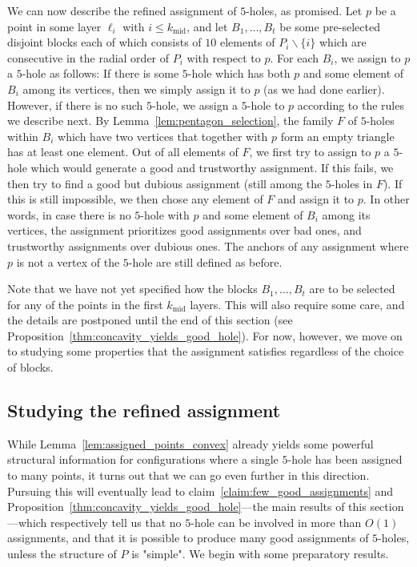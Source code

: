 \documentclass[12pt,reqno, a4paper]{amsart}
\begin{document}
We can now describe the refined assignment of $5$-holes, as promised. Let $p$ be a point in some layer $\ell_i$ with $i\leq k_{\operatorname{mid}}$, and let $B_1,\dots,B_t$ be some pre-selected disjoint blocks each of which consists of $10$ elements of $P_i\backslash\{i\}$ which are consecutive in the radial order of $P_i$ with respect to $p$. For each $B_i$, we assign to $p$ a $5$-hole as follows: If there is some $5$-hole which has both $p$ and some element of $B_i$ among its vertices, then we simply assign it to $p$ (as we had done earlier). However, if there is no such $5$-hole, we assign a $5$-hole to $p$ according to the rules we describe next. By Lemma~\ref{lem:pentagon_selection}, the family $F$ of $5$-holes within $B_i$ which have two vertices that together with $p$ form an empty triangle has at least one element. Out of all elements of $F$, we first try to assign to $p$ a $5$-hole which would generate a good and trustworthy assignment. If this fails, we then try to find a good but dubious assignment (still among the $5$-holes in $F$). If this is still impossible, we then chose any element of $F$ and assign it to $p$. In other words, in case there is no $5$-hole with $p$ and some element of $B_i$ among its vertices, the assignment prioritizes good assignments over bad ones, and trustworthy assignments over dubious ones. The anchors of any assignment where $p$ is not a vertex of the $5$-hole are still defined as before.

Note that we have not yet specified how the blocks $B_1,\dots,B_t$ are to be selected for any of the points in the first $k_{\operatorname{mid}}$ layers. This will also require some care, and the details are postponed until the end of this section (see Proposition~\ref{thm:concavity_yields_good_hole}). For now, however, we move on to studying some properties that the assignment satisfies regardless of the choice of blocks.

\subsection*{Studying the refined assignment}



While Lemma~\ref{lem:assigned_points_convex} already yields some powerful structural information for configurations where a single $5$-hole has been assigned to many points, it turns out that we can go even further in this direction. Pursuing this will eventually lead to claim~\ref{claim:few_good_assignments} and Proposition~\ref{thm:concavity_yields_good_hole}---the main results of this section---which respectively tell us that no $5$-hole can be involved in more than $O(1)$ assignments, and that it is possible to produce many good assignments of $5$-holes, unless the structure of $P$ is "simple". We begin with some preparatory results.
\end{document}
